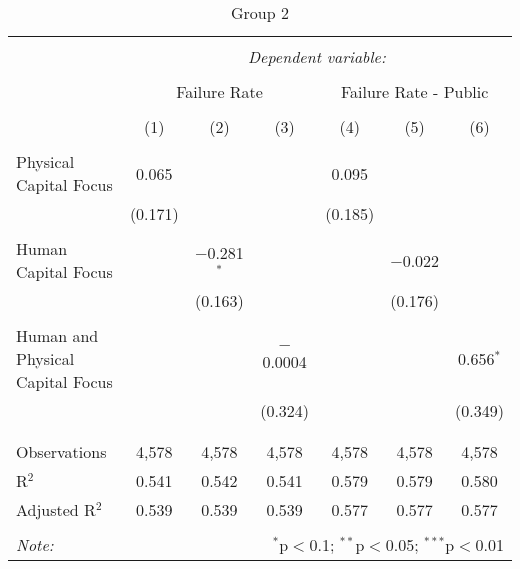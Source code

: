
\begin{table}[!htbp] \centering 
  \caption{Group 2} 
  \label{} 
\begin{tabular}{@{\extracolsep{5pt}}lcccccc} 
\\[-1.8ex]\hline 
\hline \\[-1.8ex] 
 & \multicolumn{6}{c}{\textit{Dependent variable:}} \\ 
\cline{2-7} 
\\[-1.8ex] & \multicolumn{3}{c}{Failure Rate} & \multicolumn{3}{c}{Failure Rate - Public} \\ 
\\[-1.8ex] & (1) & (2) & (3) & (4) & (5) & (6)\\ 
\hline \\[-1.8ex] 
 Physical Capital Focus & 0.065 &  &  & 0.095 &  &  \\ 
  & (0.171) &  &  & (0.185) &  &  \\ 
  & & & & & & \\ 
 Human Capital Focus &  & $-$0.281$^{*}$ &  &  & $-$0.022 &  \\ 
  &  & (0.163) &  &  & (0.176) &  \\ 
  & & & & & & \\ 
 Human and Physical Capital Focus &  &  & $-$0.0004 &  &  & 0.656$^{*}$ \\ 
  &  &  & (0.324) &  &  & (0.349) \\ 
  & & & & & & \\ 
\hline \\[-1.8ex] 
Observations & 4,578 & 4,578 & 4,578 & 4,578 & 4,578 & 4,578 \\ 
R$^{2}$ & 0.541 & 0.542 & 0.541 & 0.579 & 0.579 & 0.580 \\ 
Adjusted R$^{2}$ & 0.539 & 0.539 & 0.539 & 0.577 & 0.577 & 0.577 \\ 
\hline 
\hline \\[-1.8ex] 
\textit{Note:}  & \multicolumn{6}{r}{$^{*}$p$<$0.1; $^{**}$p$<$0.05; $^{***}$p$<$0.01} \\ 
\end{tabular} 
\end{table} 

